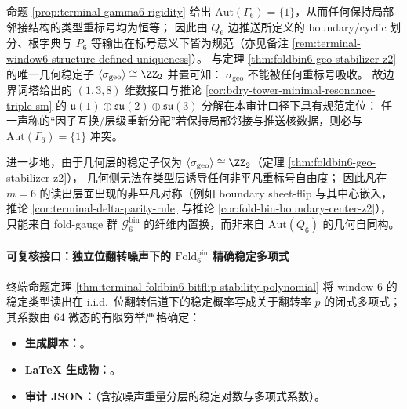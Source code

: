 \begin{remark}\label{rem:window6-no-relabeling-factor-localization}
命题 \ref{prop:terminal-gamma6-rigidity} 给出 \(\mathrm{Aut}(\Gamma_6)=\{1\}\)，从而任何保持局部邻接结构的类型重标号均为恒等；
因此由 \(Q_6\) 边推送所定义的 boundary/cyclic 划分、根字典与 \(P_6\) 等输出在标号意义下皆为规范（亦见备注 \ref{rem:terminal-window6-structure-defined-uniqueness}）。
与定理 \ref{thm:foldbin6-geo-stabilizer-z2} 的唯一几何稳定子 \(\langle\sigma_{\mathrm{geo}}\rangle\cong\ZZ_2\) 并置可知：
\(\sigma_{\mathrm{geo}}\) 不能被任何重标号吸收。
故边界词塔给出的 \((1,3,8)\) 维数接口与推论 \ref{cor:bdry-tower-minimal-resonance-triple-sm} 的
\(\mathfrak u(1)\oplus\mathfrak{su}(2)\oplus\mathfrak{su}(3)\) 分解在本审计口径下具有规范定位：
任一声称的“因子互换/层级重新分配”若保持局部邻接与推送核数据，则必与 \(\mathrm{Aut}(\Gamma_6)=\{1\}\) 冲突。
\par
进一步地，由于几何层的稳定子仅为 \(\langle\sigma_{\mathrm{geo}}\rangle\cong\ZZ_2\)（定理 \ref{thm:foldbin6-geo-stabilizer-z2}），
几何侧无法在类型层诱导任何非平凡重标号自由度；
因此凡在 \(m=6\) 的读出层面出现的非平凡对称（例如 boundary sheet-flip 与其中心嵌入，推论 \ref{cor:terminal-delta-parity-rule} 与推论 \ref{cor:fold-bin-boundary-center-z2}），
只能来自 fold-gauge 群 \(\mathcal{G}^{\mathrm{bin}}_6\) 的纤维内置换，而非来自 \(\mathrm{Aut}(Q_6)\) 的几何自同构。
\end{remark}

\paragraph{可复核接口：独立位翻转噪声下的 \texorpdfstring{$\mathrm{Fold}^{\mathrm{bin}}_6$}{Foldbin6} 精确稳定多项式}
终端命题定理 \ref{thm:terminal-foldbin6-bitflip-stability-polynomial} 将 window-\(6\) 的稳定类型读出在 i.i.d.\ 位翻转信道下的稳定概率写成关于翻转率 \(p\) 的闭式多项式；其系数由 \(64\) 微态的有限穷举严格确定：
\begin{itemize}
  \item \textbf{生成脚本：}\texttt{}。
  \item \textbf{LaTeX 生成物：}\texttt{}。
  \item \textbf{审计 JSON：}\texttt{}（含按噪声重量分层的稳定对数与多项式系数）。
\end{itemize}

